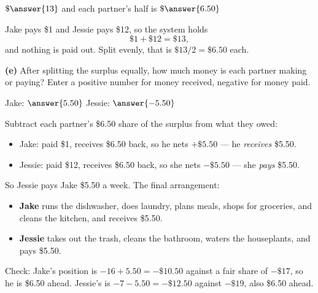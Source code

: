 \documentclass[12pt]{ximera}
\begin{document}
\begin{problem}
\begin{prompt}
$\$\answer{13}$ \qquad and each partner's half is $\$\answer{6.50}$

\begin{feedback}
Jake pays \$1 and Jessie pays \$12, so the system holds
\[ \$1 + \$12 = \$13, \]
and nothing is paid out. Split evenly, that is $\$13/2 = \$6.50$ each.
\end{feedback}
\end{prompt}

\begin{prompt}
\textbf{(e)} After splitting the surplus equally, how much money is each partner making
or paying? Enter a positive number for money received, negative for money paid.

Jake: $\answer{5.50}$ \qquad Jessie: $\answer{-5.50}$

\begin{feedback}
Subtract each partner's \$6.50 share of the surplus from what they owed:
\begin{itemize}
\item Jake: paid \$1, receives \$6.50 back, so he nets $+\$5.50$ --- he \emph{receives}
      \$5.50.
\item Jessie: paid \$12, receives \$6.50 back, so she nets $-\$5.50$ --- she
      \emph{pays} \$5.50.
\end{itemize}

So Jessie pays Jake \$5.50 a week. The final arrangement:
\begin{itemize}
\item \textbf{Jake} runs the dishwasher, does laundry, plans meals, shops for
      groceries, and cleans the kitchen, and receives \$5.50.
\item \textbf{Jessie} takes out the trash, cleans the bathroom, waters the houseplants,
      and pays \$5.50.
\end{itemize}
Check: Jake's position is $-16 + 5.50 = -\$10.50$ against a fair share of $-\$17$, so he
is \$6.50 ahead. Jessie's is $-7 - 5.50 = -\$12.50$ against $-\$19$, also \$6.50 ahead.
\checkmark
\end{feedback}
\end{prompt}
\end{problem}
\end{document}
